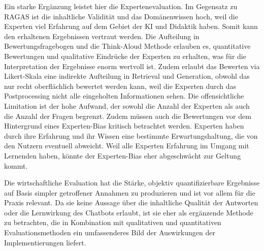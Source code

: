 Ein starke Ergänzung leistet hier die Expertenevaluation. Im Gegensatz zu RAGAS ist die inhaltliche Validität und das Domänenwissen hoch, weil die Experten viel Erfahrung auf dem Gebiet der KI und Didaktik haben. Somit kann den erhaltenen Ergebnissen vertraut werden. Die Aufteilung in Bewertungsfragebogen und die Think-Aloud Methode erlauben es, quantitative Bewertungen und qualitative Eindrücke der Experten zu erhalten, was für die Interpretation der Ergebnisse enorm wertvoll ist. Zudem erlaubt das Bewerten via Likert-Skala eine indirekte Aufteilung in Retrieval und Generation, obwohl das nur recht oberflächlich bewertet werden kann, weil die Experten durch das Postprocessing nicht alle eingeholten Informationen sehen. Die offensichtliche Limitation ist der hohe Aufwand, der sowohl die Anzahl der Experten als auch die Anzahl der Fragen begrenzt. Zudem müssen auch die Bewertungen vor dem Hintergrund eines Experten-Bias kritisch betrachtet werden. Experten haben durch ihre Erfahrung und ihr Wissen eine bestimmte Erwartungshaltung, die von den Nutzern eventuell abweicht. Weil alle Experten Erfahrung im Umgang mit Lernenden haben, könnte der Experten-Bias eher abgeschwächt zur Geltung kommt.

Die wirtschaftliche Evaluation hat die Stärke, objektiv quantifizierbare Ergebnisse auf Basis simpler getroffener Annahmen zu produzieren und ist vor allem für die Praxis relevant. Da sie keine Aussage über die inhaltliche Qualität der Antworten oder die Lernwirkung des Chatbots erlaubt, ist sie eher als ergänzende Methode zu betrachten, die in Kombination mit qualitativen und quantitativen Evaluationsmethoden ein umfassenderes Bild der Auswirkungen der Implementierungen liefert.

